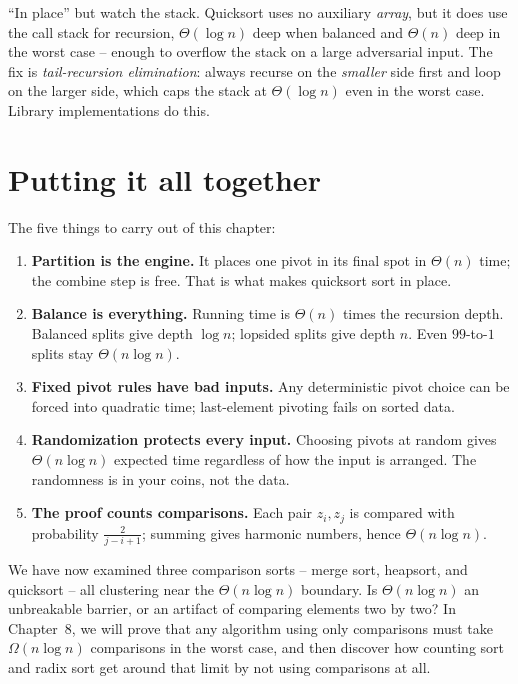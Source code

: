 \begin{trapbox}
``In place'' but watch the stack. Quicksort uses no auxiliary \emph{array}, but
it does use the call stack for recursion, $\Theta(\log n)$ deep when balanced and
$\Theta(n)$ deep in the worst case -- enough to overflow the stack on a large
adversarial input. The fix is \emph{tail-recursion elimination}: always recurse
on the \emph{smaller} side first and loop on the larger side, which caps the
stack at $\Theta(\log n)$ even in the worst case. Library implementations do
this.
\end{trapbox}

\section{Putting it all together}

\begin{focusbox}
The five things to carry out of this chapter:
\begin{enumerate}
\item \textbf{Partition is the engine.} It places one pivot in its final spot in
$\Theta(n)$ time; the combine step is free. That is what makes quicksort sort in
place.
\item \textbf{Balance is everything.} Running time is $\Theta(n)$ times the
recursion depth. Balanced splits give depth $\log n$; lopsided splits give depth
$n$. Even $99$-to-$1$ splits stay $\Theta(n\log n)$.
\item \textbf{Fixed pivot rules have bad inputs.} Any deterministic pivot choice
can be forced into quadratic time; last-element pivoting fails on sorted data.
\item \textbf{Randomization protects every input.} Choosing pivots at random gives
$\Theta(n \log n)$ expected time regardless of how the input is arranged. The randomness is in your
coins, not the data.
\item \textbf{The proof counts comparisons.} Each pair $z_i, z_j$ is compared
with probability $\frac{2}{j-i+1}$; summing gives harmonic numbers, hence
$\Theta(n \log n)$.
\end{enumerate}
\end{focusbox}

We have now examined three comparison sorts -- merge sort, heapsort, and quicksort --
all clustering near the $\Theta(n \log n)$ boundary. Is $\Theta(n \log n)$ an
unbreakable barrier, or an artifact of comparing elements two by two? In
Chapter~8, we will prove that any algorithm using only comparisons must take
$\Omega(n \log n)$ comparisons in the worst case, and then discover how counting
sort and radix sort get around that limit by not using comparisons at all.


